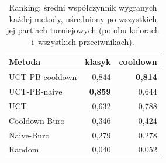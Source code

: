 \begin{table}[H]
\centering
\small
\begin{tabular}{lrr}
\toprule
Metoda & klasyk & cooldown \\
\midrule
UCT-PB-cooldown & 0,844 & \textbf{0,814} \\
UCT-PB-naive & \textbf{0,859} & 0,644 \\
UCT & 0,632 & 0,788 \\
Cooldown-Buro & 0,346 & 0,424 \\
Naive-Buro & 0,279 & 0,278 \\
Random & 0,040 & 0,052 \\
\bottomrule
\end{tabular}
\caption{Ranking: średni współczynnik wygranych każdej metody, uśredniony po wszystkich jej partiach turniejowych (po obu kolorach i~wszystkich przeciwnikach).}
\label{tab:ranking}
\end{table}